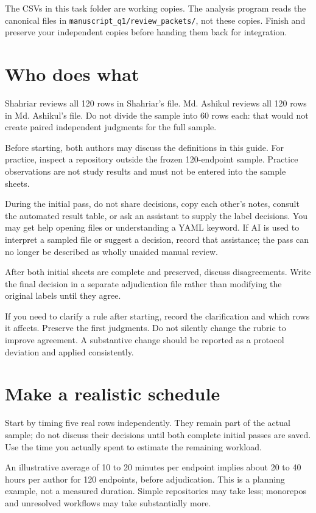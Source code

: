 \documentclass[11pt,a4paper]{article}
\begin{document}
The CSVs in this task folder are working copies. The analysis program reads the canonical files in \nolinkurl{manuscript_q1/review_packets/}, not these copies. Finish and preserve your independent copies before handing them back for integration.


\section{Who does what}


Shahriar reviews all 120 rows in Shahriar's file. Md. Ashikul reviews all 120 rows in Md. Ashikul's file. Do not divide the sample into 60 rows each: that would not create paired independent judgments for the full sample.


Before starting, both authors may discuss the definitions in this guide. For practice, inspect a repository outside the frozen 120-endpoint sample. Practice observations are not study results and must not be entered into the sample sheets.


During the initial pass, do not share decisions, copy each other's notes, consult the automated result table, or ask an assistant to supply the label decisions. You may get help opening files or understanding a YAML keyword. If AI is used to interpret a sampled file or suggest a decision, record that assistance; the pass can no longer be described as wholly unaided manual review.


After both initial sheets are complete and preserved, discuss disagreements. Write the final decision in a separate adjudication file rather than modifying the original labels until they agree.


If you need to clarify a rule after starting, record the clarification and which rows it affects. Preserve the first judgments. Do not silently change the rubric to improve agreement. A substantive change should be reported as a protocol deviation and applied consistently.


\section{Make a realistic schedule}


Start by timing five real rows independently. They remain part of the actual sample; do not discuss their decisions until both complete initial passes are saved. Use the time you actually spent to estimate the remaining workload.


An illustrative average of 10 to 20 minutes per endpoint implies about 20 to 40 hours per author for 120 endpoints, before adjudication. This is a planning example, not a measured duration. Simple repositories may take less; monorepos and unresolved workflows may take substantially more.
\end{document}
